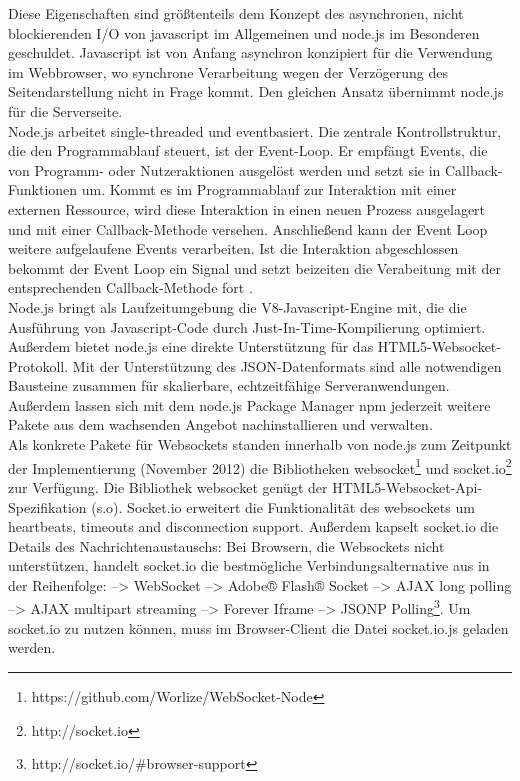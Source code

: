 Diese Eigenschaften sind größtenteils dem Konzept des asynchronen, nicht blockierenden I/O von javascript im Allgemeinen und node.js im Besonderen geschuldet.
Javascript ist von Anfang asynchron konzipiert für die Verwendung im Webbrowser, wo synchrone Verarbeitung wegen der Verzögerung des Seitendarstellung nicht in Frage kommt. Den gleichen Ansatz übernimmt node.js für die Serverseite.
\\
Node.js arbeitet single-threaded und eventbasiert. Die zentrale Kontrollstruktur, die den Programmablauf steuert, ist der Event-Loop. Er empfängt Events, die von Programm- oder Nutzeraktionen ausgelöst werden und setzt sie in Callback-Funktionen um.
Kommt es im Programmablauf zur Interaktion mit einer externen Ressource, wird diese Interaktion in einen neuen Prozess ausgelagert und mit einer Callback-Methode versehen. Anschließend kann der Event Loop weitere aufgelaufene Events verarbeiten. Ist die Interaktion abgeschlossen bekommt der Event Loop ein Signal und setzt beizeiten die Verabeitung mit der entsprechenden Callback-Methode  fort \cite{teixeira}.\\
Node.js bringt als Laufzeitumgebung die V8-Javascript-Engine mit, die die Ausführung von Javascript-Code durch Just-In-Time-Kompilierung optimiert. Außerdem bietet node.js eine direkte Unterstützung für das HTML5-Websocket-Protokoll. Mit der Unterstützung des JSON-Datenformats sind alle notwendigen Bausteine zusammen für skalierbare, echtzeitfähige Serveranwendungen.
Außerdem lassen sich mit dem node.js Package Manager npm jederzeit weitere Pakete aus dem wachsenden Angebot nachinstallieren und verwalten.\\
Als konkrete Pakete für Websockets standen innerhalb von node.js zum Zeitpunkt der Implementierung (November 2012) die Bibliotheken websocket\footnote{https://github.com/Worlize/WebSocket-Node} und socket.io\footnote{http://socket.io} zur Verfügung. Die Bibliothek websocket genügt der HTML5-Websocket-Api-Spezifikation (s.o). Socket.io erweitert die Funktionalität des websockets um heartbeats, timeouts and disconnection support. Außerdem kapselt socket.io die Details des Nachrichtenaustauschs: Bei Browsern, die Websockets nicht unterstützen, handelt socket.io die bestmögliche Verbindungsalternative aus in der Reihenfolge: 
-->    WebSocket 
 -->   Adobe® Flash® Socket
  -->  AJAX long polling
   --> AJAX multipart streaming
 -->   Forever Iframe
 -->   JSONP Polling\footnote{http://socket.io/\#browser-support}.
Um socket.io zu nutzen können, muss im Browser-Client die Datei socket.io.js geladen werden.
